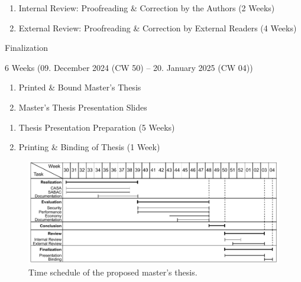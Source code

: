 \begin{description}
\begin{description}[style=multiline, leftmargin=\widthof{\textbf{Deliverables:}}]
        \item[Increments:]
        \begin{enumerate}[label=\arabic*), leftmargin=\widthof{a)}+\labelsep]
            \item Internal Review: Proofreading \& Correction by the Authors (2 Weeks)
            \item External Review: Proofreading \& Correction by External Readers (4 Weeks)
        \end{enumerate}
    \end{description}
    \item[Milestone VI:] Finalization
    \begin{description}[style=multiline, leftmargin=\widthof{\textbf{Deliverables:}}]
        \item[Duration:] 6 Weeks (09. December 2024 (CW 50) -- 20. January 2025 (CW 04))
        \item[Deliverables:]
        \begin{enumerate}[label=\alph*), leftmargin=\widthof{a)}+\labelsep]
            \item Printed \& Bound Master's Thesis
            \item Master's Thesis Presentation Slides
        \end{enumerate}
        \item[Increments:]
        \begin{enumerate}[label=\arabic*), leftmargin=\widthof{a)}+\labelsep]
            \item Thesis Presentation Preparation (5 Weeks)
            \item Printing \& Binding of Thesis (1 Week)
        \end{enumerate}
    \end{description}
\end{description}
\begin{figure}
    \centering
    \includegraphics[width=1.0\linewidth]{figures/timeplan.drawio.pdf}
    \caption{Time schedule of the proposed master's thesis.}
    \label{fig:timeplan}
\end{figure}

